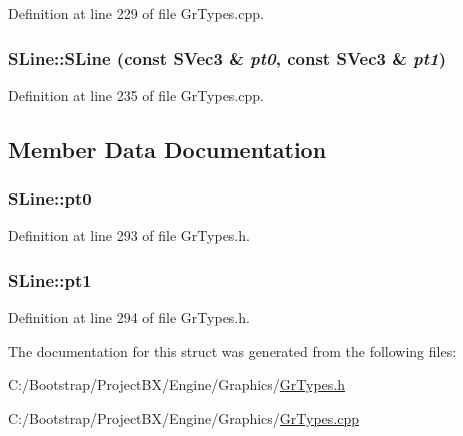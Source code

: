 Definition at line 229 of file GrTypes.cpp.\hypertarget{struct_s_line_a39ad4590b42df8aa896c5256879c636}{
\subsubsection[{SLine}]{\setlength{\rightskip}{0pt plus 5cm}SLine::SLine (const {\bf SVec3} \& {\em pt0}, \/  const {\bf SVec3} \& {\em pt1})}}
\label{struct_s_line_a39ad4590b42df8aa896c5256879c636}




Definition at line 235 of file GrTypes.cpp.

\subsection{Member Data Documentation}
\hypertarget{struct_s_line_757820d696674d25072d491ee1e967aa}{
\subsubsection[{pt0}]{ {\bf SLine::pt0}}}
\label{struct_s_line_757820d696674d25072d491ee1e967aa}




Definition at line 293 of file GrTypes.h.\hypertarget{struct_s_line_5c00b80942438354c972a1135a2ba5f5}{
\subsubsection[{pt1}]{ {\bf SLine::pt1}}}
\label{struct_s_line_5c00b80942438354c972a1135a2ba5f5}




Definition at line 294 of file GrTypes.h.

The documentation for this struct was generated from the following files:\begin{CompactItemize}
\item 
C:/Bootstrap/ProjectBX/Engine/Graphics/\hyperlink{_gr_types_8h}{GrTypes.h}\item 
C:/Bootstrap/ProjectBX/Engine/Graphics/\hyperlink{_gr_types_8cpp}{GrTypes.cpp}\end{CompactItemize}
